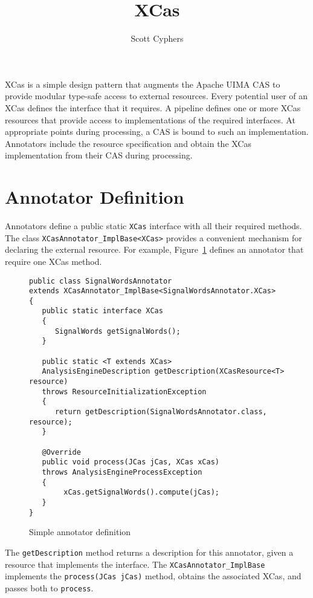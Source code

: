 \documentclass[12pt]{article} %
\title{XCas}
\author{Scott Cyphers}
\begin{document}
\maketitle
\abstract
XCas is a simple design pattern that augments the Apache UIMA CAS to provide modular type-safe access to external resources.  Every potential user
of an XCas defines the interface that it requires.  A pipeline defines one or more XCas resources that provide access to implementations of the required interfaces.  At appropriate points during processing, a CAS is bound to such an implementation.  Annotators include the resource specification and
obtain the XCas implementation from their CAS during processing.

\section*{Annotator Definition}
Annotators define a public static \texttt{XCas} interface with all their required methods.  The class \texttt{XCasAnnotator\_ImplBase<XCas>}
provides a convenient mechanism for declaring the external resource.  For example, Figure~\ref{FIG:SimpleAnnotator} defines an annotator
that require one XCas method.
\begin{figure}
\begin{verbatim}
public class SignalWordsAnnotator
extends XCasAnnotator_ImplBase<SignalWordsAnnotator.XCas> 
{
   public static interface XCas
   {
      SignalWords getSignalWords();
   }
	
   public static <T extends XCas> 
   AnalysisEngineDescription getDescription(XCasResource<T> resource)
   throws ResourceInitializationException 
   {
      return getDescription(SignalWordsAnnotator.class, resource);
   }

   @Override
   public void process(JCas jCas, XCas xCas) 
   throws AnalysisEngineProcessException 
   {
        xCas.getSignalWords().compute(jCas);
   }
}
\end{verbatim}
\caption{Simple annotator definition}
\label{FIG:SimpleAnnotator}
\end{figure}
The \texttt{getDescription} method returns a description for this annotator, given a resource that implements the interface.  The
\texttt{XCasAnnotator\_ImplBase} implements the \texttt{process(JCas jCas)} method, obtains the associated XCas, and passes
both to \texttt{process}.
\end{document}
